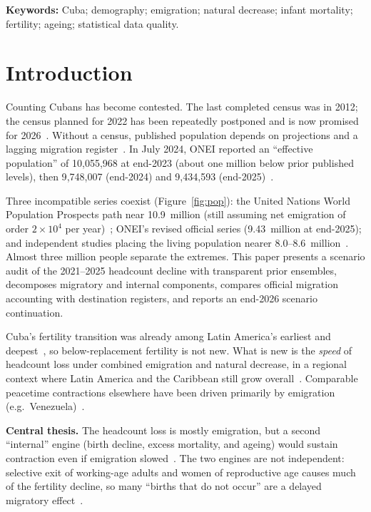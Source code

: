 \documentclass[11pt,a4paper]{article}
\begin{document}
\noindent\textbf{Keywords:} Cuba; demography; emigration; natural decrease; infant mortality; fertility; ageing; statistical data quality.

\section{Introduction}

Counting Cubans has become contested.
The last completed census was in 2012; the census planned for 2022 has been repeatedly postponed and is now promised for 2026~\citep{onei_census}.
Without a census, published population depends on projections and a lagging migration register~\citep{preston2001,un_wpp}.
In July 2024, ONEI reported an ``effective population'' of 10{,}055{,}968 at end-2023 (about one million below prior published levels), then 9{,}748{,}007 (end-2024) and 9{,}434{,}593 (end-2025)~\citep{onei_revision,onei_2025}.

Three incompatible series coexist (Figure~\ref{fig:pop}):
the United Nations World Population Prospects path near 10.9~million (still assuming net emigration of order $2\times10^4$ per year)~\citep{un_wpp,eclac2022};
ONEI's revised official series (9.43~million at end-2025);
and independent studies placing the living population nearer 8.0--8.6~million~\citep{albizu2025,albizu2024}.
Almost three million people separate the extremes.
This paper presents a scenario audit of the 2021--2025 headcount decline with transparent prior ensembles, decomposes migratory and internal components, compares official migration accounting with destination registers, and reports an end-2026 scenario continuation.

Cuba's fertility transition was already among Latin America's earliest and deepest~\citep{diazbriquets1982,hollerbach1984,diazbriquets2014}, so below-replacement fertility is not new.
What is new is the \emph{speed} of headcount loss under combined emigration and natural decrease, in a regional context where Latin America and the Caribbean still grow overall~\citep{eclac2022,un_wpp}.
Comparable peacetime contractions elsewhere have been driven primarily by emigration (e.g.\ Venezuela)~\citep{garcia2019}.

\textbf{Central thesis.}
The headcount loss is mostly emigration, but a second ``internal'' engine (birth decline, excess mortality, and ageing) would sustain contraction even if emigration slowed~\citep{lee2014,lesthaeghe2010}.
The two engines are not independent: selective exit of working-age adults and women of reproductive age causes much of the fertility decline, so many ``births that do not occur'' are a delayed migratory effect~\citep{bongaarts2009,diazbriquets2014}.
\end{document}
